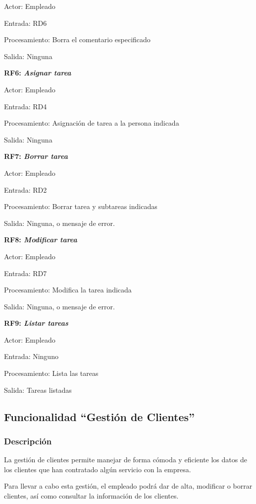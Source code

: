 \documentclass[paper=a4, fontsize=11pt, spanish]{scrartcl}
\begin{document}
Actor: Empleado

Entrada: RD6

Procesamiento: Borra el comentario especificado

Salida: Ninguna

\setlength{\parindent}{0em}
\textbf{RF6: \textit{Asignar tarea}}
\setlength{\parindent}{2em}

Actor: Empleado

Entrada: RD4

Procesamiento: Asignación de tarea a la persona indicada

Salida: Ninguna

\setlength{\parindent}{0em}
\textbf{RF7: \textit{Borrar tarea}}
\setlength{\parindent}{2em}

Actor: Empleado

Entrada: RD2

Procesamiento: Borrar tarea y subtareas indicadas

Salida: Ninguna, o mensaje de error.

\setlength{\parindent}{0em}
\textbf{RF8: \textit{Modificar tarea}}
\setlength{\parindent}{2em}

Actor: Empleado

Entrada: RD7

Procesamiento: Modifica la tarea indicada

Salida: Ninguna, o mensaje de error.

\setlength{\parindent}{0em}
\textbf{RF9: \textit{Listar tareas}}
\setlength{\parindent}{2em}

Actor: Empleado

Entrada: Ninguno

Procesamiento: Lista las tareas

Salida: Tareas listadas

\subsection{Funcionalidad “Gestión de Clientes”}

\subsubsection{Descripción}
\setlength{\parindent}{3em} La gestión de clientes permite manejar de forma cómoda y eficiente los datos de los clientes que han contratado algún servicio con la empresa.

Para llevar a cabo esta gestión, el empleado podrá dar de alta, modificar o borrar clientes, así como consultar la información de los clientes.
\end{document}
